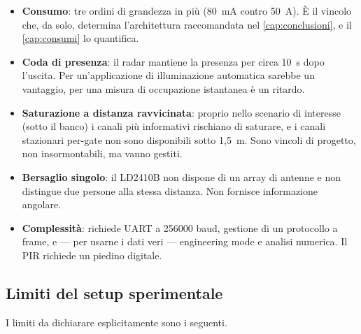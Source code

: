 \begin{itemize}[leftmargin=1.4em,itemsep=3pt]
  \item \textbf{Consumo}: tre ordini di grandezza in più (80~mA contro 50~\textmu A).
        È il vincolo che, da solo, determina l'architettura raccomandata nel
        \cref{cap:conclusioni}, e il \cref{cap:consumi} lo quantifica.
  \item \textbf{Coda di presenza}: il radar mantiene la presenza per circa 10~s dopo
        l'uscita. Per un'applicazione di illuminazione automatica sarebbe un
        vantaggio, per una misura di occupazione istantanea è un ritardo.
  \item \textbf{Saturazione a distanza ravvicinata}: proprio nello scenario di
        interesse (sotto il banco) i canali più informativi rischiano di saturare,
        e i canali stazionari per-gate non sono disponibili sotto 1,5~m. Sono
        vincoli di progetto, non insormontabili, ma vanno gestiti.
  \item \textbf{Bersaglio singolo}: il LD2410B non dispone di un array di antenne e
        non distingue due persone alla stessa distanza. Non fornisce informazione
        angolare.
  \item \textbf{Complessità}: richiede UART a 256000 baud, gestione di un protocollo
        a frame, e --- per usarne i dati veri --- engineering mode e analisi
        numerica. Il PIR richiede un piedino digitale.
\end{itemize}

\subsection{Limiti del setup sperimentale}
\label{sec:limiti}

I limiti da dichiarare esplicitamente sono i seguenti.

